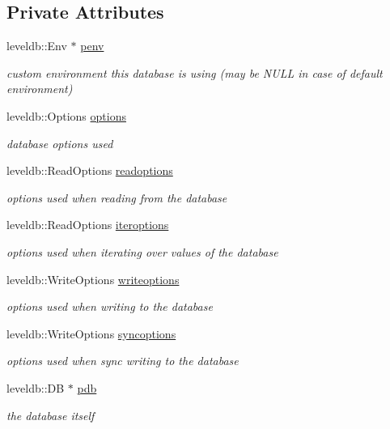 \subsection*{Private Attributes}
\begin{DoxyCompactItemize}
\item 
leveldb\+::\+Env $\ast$ \mbox{\hyperlink{class_c_level_d_b_wrapper_a77cb10f4311b2e0d9cf9860d5928e793}{penv}}
\begin{DoxyCompactList}\small\item\em custom environment this database is using (may be N\+U\+LL in case of default environment) \end{DoxyCompactList}\item 
leveldb\+::\+Options \mbox{\hyperlink{class_c_level_d_b_wrapper_a338bb92acad2521bc17ecf5e80862efd}{options}}
\begin{DoxyCompactList}\small\item\em database options used \end{DoxyCompactList}\item 
leveldb\+::\+Read\+Options \mbox{\hyperlink{class_c_level_d_b_wrapper_ada6b5ac987e1e4e9765696a9c059454c}{readoptions}}
\begin{DoxyCompactList}\small\item\em options used when reading from the database \end{DoxyCompactList}\item 
leveldb\+::\+Read\+Options \mbox{\hyperlink{class_c_level_d_b_wrapper_a284f69f5c017c0537d51ba373291f195}{iteroptions}}
\begin{DoxyCompactList}\small\item\em options used when iterating over values of the database \end{DoxyCompactList}\item 
leveldb\+::\+Write\+Options \mbox{\hyperlink{class_c_level_d_b_wrapper_a2761173f9be7d16c7306f5a3565068ca}{writeoptions}}
\begin{DoxyCompactList}\small\item\em options used when writing to the database \end{DoxyCompactList}\item 
leveldb\+::\+Write\+Options \mbox{\hyperlink{class_c_level_d_b_wrapper_a0929ea3b9ae8cdd1fbdeba0caaba6869}{syncoptions}}
\begin{DoxyCompactList}\small\item\em options used when sync writing to the database \end{DoxyCompactList}\item 
leveldb\+::\+DB $\ast$ \mbox{\hyperlink{class_c_level_d_b_wrapper_ad3d3c82253cf83457c2df10f63962b76}{pdb}}
\begin{DoxyCompactList}\small\item\em the database itself \end{DoxyCompactList}\end{DoxyCompactItemize}


